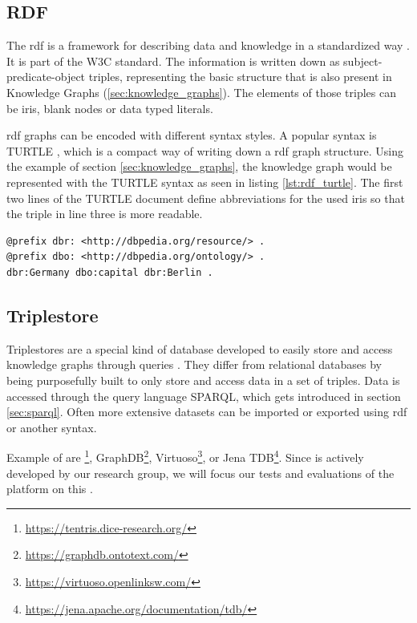 \subsection{RDF}
\label{sec:rdf}
The \acf{rdf} is a framework for describing data and knowledge in a standardized way \cite{RDFConceptsAbstract}. 
It is part of the W3C standard.
The information is written down as subject-predicate-object triples, representing the basic structure that is also present in Knowledge Graphs (\ref{sec:knowledge_graphs}).
The elements of those triples can be \acp{iri}, blank nodes or data typed literals.

\ac{rdf} graphs can be encoded with different syntax styles.
A popular syntax is TURTLE \cite{RDFTurtle}, which is a compact way of writing down a \ac{rdf} graph structure.
Using the example of section \ref{sec:knowledge_graphs}, the knowledge graph would be represented with the TURTLE syntax as seen in listing \ref{lst:rdf_turtle}.
The first two lines of the TURTLE document define abbreviations for the used \acp{iri} so that the triple in line three is more readable.

\begin{lstlisting}[caption={RDF example in TURTLE syntax}, label=lst:rdf_turtle]
@prefix dbr: <http://dbpedia.org/resource/> .
@prefix dbo: <http://dbpedia.org/ontology/> .
dbr:Germany dbo:capital dbr:Berlin .
\end{lstlisting}


\subsection{Triplestore}
\label{sec:triplestores}
Triplestores are a special kind of database developed to easily store and access knowledge graphs through queries \cite{rusherTriplestoresRetrievedFeb}.
They differ from relational databases by being purposefully built to only store and access data in a set of triples.
Data is accessed through the query language SPARQL, which gets introduced in section \ref{sec:sparql}.
Often more extensive datasets can be imported or exported using \ac{rdf} or another syntax.

Example of \tsp{} are \tentris{}\footnote{\url{https://tentris.dice-research.org/}}, GraphDB\footnote{\url{https://graphdb.ontotext.com/}}, Virtuoso\footnote{\url{https://virtuoso.openlinksw.com/}}, or Jena TDB\footnote{\url{https://jena.apache.org/documentation/tdb/}}.
Since \tentris{} is actively developed by our research group, we will focus our tests and evaluations of the platform on this \ts{}.

